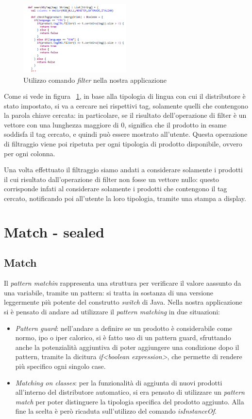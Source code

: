 \begin{figure}[h]
	\centering
	\includegraphics[width=0.5\textwidth]{Immagini/Filter.png}
	\caption{Utilizzo comando \textit{filter} nella nostra applicazione}
	\label{fig:filter}
\end{figure}
Come si vede in figura ~\ref{fig:filter}, in base alla tipologia di lingua con cui il distributore è stato impostato, si va a cercare nei rispettivi tag, solamente quelli che contengono la parola chiave cercata: in particolare, se il risultato dell'operazione di filter è un vettore con una lunghezza maggiore di 0, significa che il prodotto in esame soddisfa il tag cercato, e quindi può essere mostrato all'utente. Questa operazione di filtraggio viene poi ripetuta per ogni tipologia di prodotto disponibile, ovvero per ogni colonna. 

Una volta effettuato il filtraggio siamo andati a considerare solamente i prodotti il cui risultato dall'operazione di filter non fosse un vettore nullo: questo corrisponde infati al considerare solamente i prodotti che contengono il tag cercato, notificando poi all'utente la loro tipologia, tramite una stampa a display.
\section{Match - sealed}
\subsection{Match}
Il \textit{pattern matchin} rappresenta una struttura per verificare il valore aassunto da una variabile, tramite un pattern: si tratta in sostanza di una versione leggermente più potente del construtto \textit{switch} di Java.
Nella nostra applicazione si è pensato di andare ad utilizzare il \textit{pattern matching} in due situazioni:
\begin{itemize}
	\item \textit{Pattern guard}: nell'andare a definire se un prodotto è considerabile come normo, ipo o iper calorico, si è fatto uso di un pattern guard, sfruttando anche la potenzialità aggiuntiva di poter aggiungere una condizione dopo il pattern, tramite la dicitura \textit{if<boolean expression>}, che permette di rendere più specifico ogni singolo case.
	\item \textit{Matching on classes}: per la funzionalità di aggiunta di nuovi prodotti all'interno del distributore automatico, si era pensato di utilizzare un \textit{pattern match} per poter distinguere la tipologia specifica del prodotto aggiunto. Alla fine la scelta è però ricaduta sull'utilizzo del comando \textit{isInstanceOf}.
\end{itemize}
